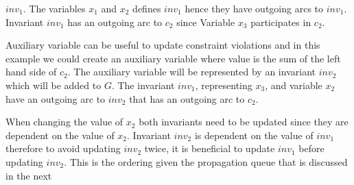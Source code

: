 $inv_1$. The variables $x_1$ and $x_2$ defines $inv_1$ hence they have outgoing arcs to $inv_1$. Invariant $inv_1$ has 
an outgoing arc to $c_2$ since Variable $x_3$ participates in $c_2$. \\
\begin{figure}[b]
\begin{center}
    \label{fig_smallG}
\end{center}
\end{figure} \noindent
Auxiliary variable can be useful to update constraint violations and in this example we could create an auxiliary 
variable where value is the sum of the left hand side of $c_2$. The auxiliary variable will be represented 
by an invariant $inv_2$ which will be added to $G$. The invariant $inv_1$, representing $x_3$, and variable $x_2$ have 
an outgoing arc to $inv_2$ that has an outgoing arc to $c_2$.
\begin{figure}[b]
\begin{center}
    \label{fig_smallG2}
\end{center}
\end{figure}   \label{fig_smallG} 
When changing the value of $x_2$ both invariants need to be updated since they are dependent on the value of $x_2$. 
Invariant $inv_2$ is dependent on the value of $inv_1$ therefore to avoid updating $inv_2$ twice, it is beneficial to 
update 
$inv_1$ before updating $inv_2$. This is the ordering given the propagation queue that is discussed in the next 
